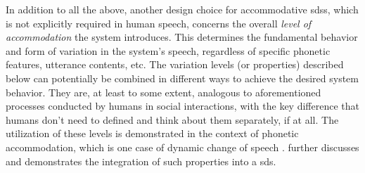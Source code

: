 In addition to all the above, another design choice for accommodative \acp{sds}, which is not explicitly required in human speech, concerns the overall \emph{level of accommodation} the system introduces.
This determines the fundamental behavior and form of variation in the system's speech, regardless of specific phonetic features, utterance contents, etc.
The variation levels (or properties) described below can potentially be combined in different ways to achieve the desired system behavior.
They are, at least to some extent, analogous to aforementioned processes conducted by humans in social interactions, with the key difference that humans don't need to defined and think about them separately, if at all.
The utilization of these levels is demonstrated in the context of phonetic accommodation, which is one case of dynamic change of speech \citep[as in][to name a few]{Weise2019individual, Schweitzer2016exemplar, Bevnuvs2014social}.
 further discusses and demonstrates the integration of such properties into a \ac{sds}.


